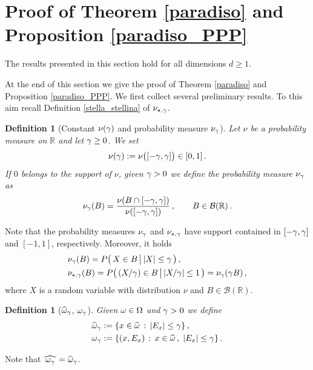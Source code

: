 \documentclass[12pt,a4paper,reqno]{amsart}
\newtheorem{Definition}[Theorem]{Definition}
\newcommand{\cB}{\ensuremath{\mathcal B}}
\newcommand{\bbR}{{\ensuremath{\mathbb R}} }
\let\O=\Omega \let\P=\Pi   \let\Ps=\Psi \let\Si=\Sigma \let\X=\Xi
\newcommand{\be}{\begin{equation}}
\newcommand{\en}{\end{equation}}
\begin{document}
\section{Proof of Theorem \ref{paradiso} and Proposition \ref{paradiso_PPP}}\label{Tarvisio}


The results presented in this section hold for all dimensions $d\geq 1$.

\medskip

At the end of this section we give the proof of Theorem \ref{paradiso} and Proposition \ref{paradiso_PPP}. We first collect several preliminary results. To this aim 
recall Definition \ref{stella_stellina} of $\nu_{\star,\gamma}$.
\begin{Definition}[Constant $\nu(\gamma)$ and probability measure $\nu_\gamma$] \label{san_benedetto}
Let  $\nu$ be   a  probability measure on $\bbR$ and let  $\gamma\geq 0$.  We set 
\begin{equation}\label{alloro}
\nu(\gamma):=  \nu \bigl([ -\gamma , \gamma]\bigr)\in [0,1]\,.
 \end{equation}
 If $0$ belongs to the support of $\nu$, given $\gamma>0$ we define the  probability measure   $\nu_{ \gamma} $ as
 \be
 \nu _{\g} ( B ) =\frac{\nu ( B \cap [-\g, \g])}{\nu([-\g, \g])} \,, \qquad B \in \cB (\bbR) \,.\label{sette1}
 \en
\end{Definition}
Note that the  probability measures  $\nu_{ \gamma} $ and  $\nu_{\star,\gamma}$ have  support contained in   $[ -\gamma , \gamma]$ and $[-1,1]$, respectively. Moreover, it holds 
\begin{align}
& \nu _{\gamma} ( B )= P\big(\,   X \in B \,\big{|}\, |X |\leq \gamma \,\big)\,,\label{sette1_bis}\\
&   \nu _{\star,\gamma} ( B )= P\big(\,  (X/\gamma) \in B \,\big{|}\, |X/\gamma |\leq 1\,\big) =\nu_\gamma(\gamma B) \,,\label{sette2}
 \end{align}
where $X$ is a random variable with distribution  $\nu$ and $B\in \cB(\bbR)$.




\begin{Definition}[$ \widehat{\omega}_\gamma$, $\omega_\gamma$] \label{porto_dascoli}
Given $\o \in \O$ and $\gamma >0$ we define 
\begin{align}
& \widehat{\omega}_\gamma:=\{x\in \widehat {\omega}\,:\, |E_x| \leq \gamma\}\,,\label{flautino1}\\
& \omega_\gamma :=\{ (x, E_x)\,:\, x\in \widehat{\omega} \,, \; |E_x| \leq \gamma\}\,. \label{flautino2}
\end{align}
\end{Definition}
Note that $\widehat{\,\omega_\gamma\, } = {\widehat{\omega}}_\gamma$. 
\end{document}
